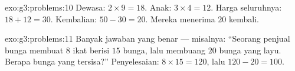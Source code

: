 \begin{solution}{exo:g3:problems:10}
Dewasa: $2 \times 9 = 18$. Anak: $3 \times 4 = 12$. Harga seluruhnya:
$18 + 12 = 30$. Kembalian: $50 - 30 = 20$. Mereka menerima $20$ kembali.
\end{solution}

\begin{solution}{exo:g3:problems:11}
Banyak jawaban yang benar --- misalnya: ``Seorang penjual bunga
membuat $8$ ikat berisi $15$ bunga, lalu membuang $20$ bunga yang
layu. Berapa bunga yang tersisa?'' Penyelesaian: $8 \times 15 = 120$,
lalu $120 - 20 = 100$.

\end{solution}
